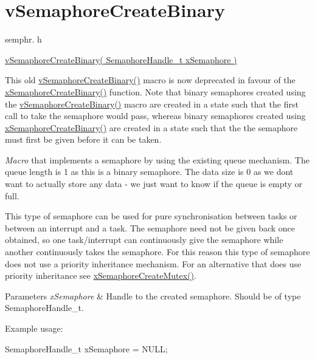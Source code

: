 \hypertarget{group__v_semaphore_create_binary}{}\section{v\+Semaphore\+Create\+Binary}
\label{group__v_semaphore_create_binary}
semphr. h 
\begin{DoxyPre}\hyperlink{semphr_8h_ae10bffadd26fbd5bcce76bf33a83ef30}{vSemaphoreCreateBinary( SemaphoreHandle\_t xSemaphore )}\end{DoxyPre}


This old \hyperlink{semphr_8h_ae10bffadd26fbd5bcce76bf33a83ef30}{v\+Semaphore\+Create\+Binary()} macro is now deprecated in favour of the \hyperlink{semphr_8h_acba963695e4f159d9bfa2394cae5badc}{x\+Semaphore\+Create\+Binary()} function. Note that binary semaphores created using the \hyperlink{semphr_8h_ae10bffadd26fbd5bcce76bf33a83ef30}{v\+Semaphore\+Create\+Binary()} macro are created in a state such that the first call to \textquotesingle{}take\textquotesingle{} the semaphore would pass, whereas binary semaphores created using \hyperlink{semphr_8h_acba963695e4f159d9bfa2394cae5badc}{x\+Semaphore\+Create\+Binary()} are created in a state such that the the semaphore must first be \textquotesingle{}given\textquotesingle{} before it can be \textquotesingle{}taken\textquotesingle{}.

{\itshape Macro} that implements a semaphore by using the existing queue mechanism. The queue length is 1 as this is a binary semaphore. The data size is 0 as we don\textquotesingle{}t want to actually store any data -\/ we just want to know if the queue is empty or full.

This type of semaphore can be used for pure synchronisation between tasks or between an interrupt and a task. The semaphore need not be given back once obtained, so one task/interrupt can continuously \textquotesingle{}give\textquotesingle{} the semaphore while another continuously \textquotesingle{}takes\textquotesingle{} the semaphore. For this reason this type of semaphore does not use a priority inheritance mechanism. For an alternative that does use priority inheritance see \hyperlink{semphr_8h_aa6a00aa9b91a9e5b3ebe4ae1c3f115c6}{x\+Semaphore\+Create\+Mutex()}.


\begin{DoxyParams}{Parameters}
{\em x\+Semaphore} & Handle to the created semaphore. Should be of type Semaphore\+Handle\+\_\+t.\\
\hline
\end{DoxyParams}
Example usage\+: 
\begin{DoxyPre}
SemaphoreHandle\_t xSemaphore = NULL;\end{DoxyPre}



